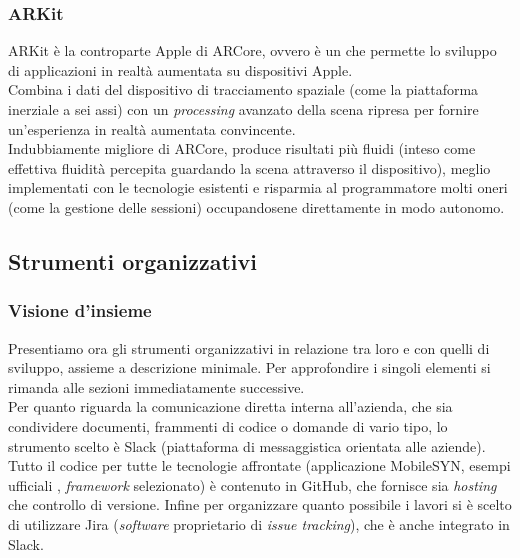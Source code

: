 \subsubsection{ARKit}
ARKit è la controparte Apple di ARCore, ovvero è un \sdk{} che permette lo sviluppo di applicazioni in realtà aumentata su dispositivi Apple.\\
Combina i dati del dispositivo di tracciamento spaziale (come la piattaforma inerziale a sei assi) con un \textit{processing} avanzato della scena ripresa per fornire un'esperienza in realtà aumentata convincente.\\
Indubbiamente migliore di ARCore, produce risultati più fluidi (inteso come effettiva fluidità percepita guardando la scena attraverso il dispositivo), meglio implementati con le tecnologie esistenti e risparmia al programmatore molti oneri (come la gestione delle sessioni) occupandosene direttamente in modo autonomo.
\subsection{Strumenti organizzativi}
\subsubsection{Visione d'insieme}
Presentiamo ora gli strumenti organizzativi in relazione tra loro e con quelli di sviluppo, assieme a descrizione minimale. Per approfondire i singoli elementi si rimanda alle sezioni immediatamente successive.\\
Per quanto riguarda la comunicazione diretta interna all'azienda, che sia condividere documenti, frammenti di codice o domande di vario tipo, lo strumento scelto è Slack (piattaforma di messaggistica orientata alle aziende).\\
Tutto il codice per tutte le tecnologie affrontate (applicazione MobileSYN, esempi ufficiali \asa{}, \textit{framework} selezionato) è contenuto in GitHub, che fornisce sia \textit{hosting} che controllo di versione. Infine per organizzare quanto possibile i lavori si è scelto di utilizzare Jira (\textit{software} proprietario di \textit{issue tracking}), che è anche integrato in Slack.

